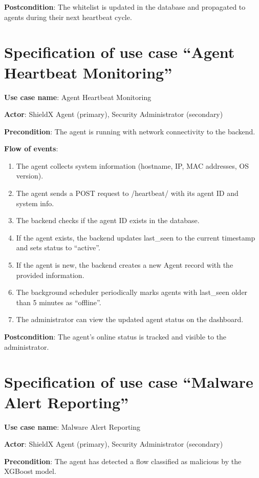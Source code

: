 \documentclass[../Main.tex]{subfiles}
\begin{document}
\textbf{Postcondition}: The whitelist is updated in the database and propagated to agents during their next heartbeat cycle.

\section{Specification of use case ``Agent Heartbeat Monitoring''}

\textbf{Use case name}: Agent Heartbeat Monitoring

\textbf{Actor}: ShieldX Agent (primary), Security Administrator (secondary)

\textbf{Precondition}: The agent is running with network connectivity to the backend.

\textbf{Flow of events}:
\begin{enumerate}
    \item The agent collects system information (hostname, IP, MAC addresses, OS version).
    \item The agent sends a POST request to /heartbeat/ with its agent ID and system info.
    \item The backend checks if the agent ID exists in the database.
    \item If the agent exists, the backend updates last\_seen to the current timestamp and sets status to ``active''.
    \item If the agent is new, the backend creates a new Agent record with the provided information.
    \item The background scheduler periodically marks agents with last\_seen older than 5 minutes as ``offline''.
    \item The administrator can view the updated agent status on the dashboard.
\end{enumerate}

\textbf{Postcondition}: The agent's online status is tracked and visible to the administrator.

\section{Specification of use case ``Malware Alert Reporting''}

\textbf{Use case name}: Malware Alert Reporting

\textbf{Actor}: ShieldX Agent (primary), Security Administrator (secondary)

\textbf{Precondition}: The agent has detected a flow classified as malicious by the XGBoost model.
\end{document}
